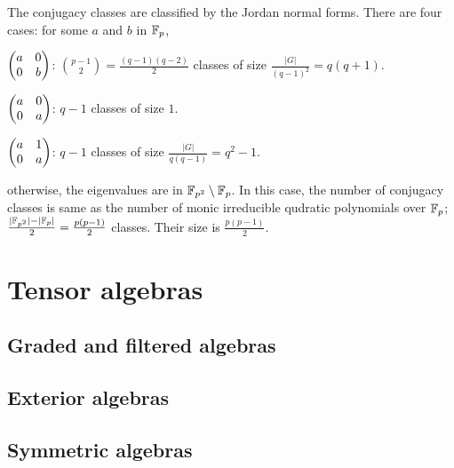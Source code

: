 \documentclass{../../large}
\begin{document}
\begin{prb}
The conjugacy classes are classified by the Jordan normal forms.
There are four cases: for some $a$ and $b$ in $\mathbb{F}_p$,
\begin{parts}
\item $\begin{pmatrix}a&0\\0&b\end{pmatrix}$: $\binom{p-1}2=\frac{(q-1)(q-2)}2$ classes of size $\frac{|G|}{(q-1)^2}=q(q+1)$.
\item $\begin{pmatrix}a&0\\0&a\end{pmatrix}$: $q-1$ classes of size $1$.
\item $\begin{pmatrix}a&1\\0&a\end{pmatrix}$: $q-1$ classes of size $\frac{|G|}{q(q-1)}=q^2-1$.
\item otherwise, the eigenvalues are in $\mathbb{F}_{p^2}\setminus\mathbb{F}_p$.
In this case, the number of conjugacy classes is same as the number of monic irreducible qudratic polynomials over $\mathbb{F}_p$; $\frac{|\mathbb{F}_{p^2}|-|\mathbb{F}_p|}2=\frac{p(p-1)}2$ classes.
Their size is $\frac{p(p-1)}2$.
\end{parts}
\end{prb}





\chapter{Tensor algebras}
\section{Graded and filtered algebras}
\section{Exterior algebras}
\begin{prb}[Determinants]
\end{prb}
\section{Symmetric algebras}
\end{document}
